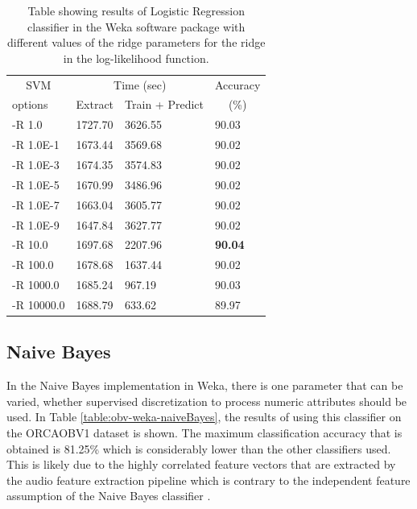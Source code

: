 \documentclass[12pt,oneside]{book}
\begin{document}
\begin{table}
\begin{tabular}{|l|l|l|l|}
\hline
\multicolumn{1}{|c|}{SVM} & \multicolumn{2}{c|}{Time (sec)} & Accuracy \\
\hhline{|~|-|-|~|}
options & Extract & Train + Predict & \multicolumn{1}{c|}{(\%)} \\
\hhline{|=|=|=|=|}
-R 1.0      &  1727.70  &    3626.55  &  90.03  \\
-R 1.0E-1   &  1673.44  &    3569.68  &  90.02  \\
-R 1.0E-3   &  1674.35  &    3574.83  &  90.02  \\
-R 1.0E-5   &  1670.99  &    3486.96  &  90.02  \\
-R 1.0E-7   &  1663.04  &    3605.77  &  90.02  \\
-R 1.0E-9   &  1647.84  &    3627.77  &  90.02  \\
-R 10.0     &  1697.68  &    2207.96  &  \textbf{90.04}  \\
-R 100.0    &  1678.68  &    1637.44  &  90.02  \\
-R 1000.0   &  1685.24  &     967.19  &  90.03  \\
-R 10000.0  &  1688.79  &     633.62  &  89.97  \\
\hline
\end{tabular}
\caption{Table showing results of Logistic Regression classifier in
  the Weka software package with different values of the ridge
  parameters for the ridge in the log-likelihood function.}
\label{table:obv-weka-logistic}
\end{table}

%
%
\subsection{Naive Bayes}

In the Naive Bayes implementation in Weka, there is one parameter that
can be varied, whether supervised discretization to process numeric
attributes should be used.  In Table \ref{table:obv-weka-naiveBayes},
the results of using this classifier on the ORCAOBV1 dataset is shown.
The maximum classification accuracy that is obtained is 81.25\% which
is considerably lower than the other classifiers used.  This is likely
due to the highly correlated feature vectors that are extracted by the
audio feature extraction pipeline which is contrary to the independent
feature assumption of the Naive Bayes classifier
\cite{john1995estimating}.
\end{document}
